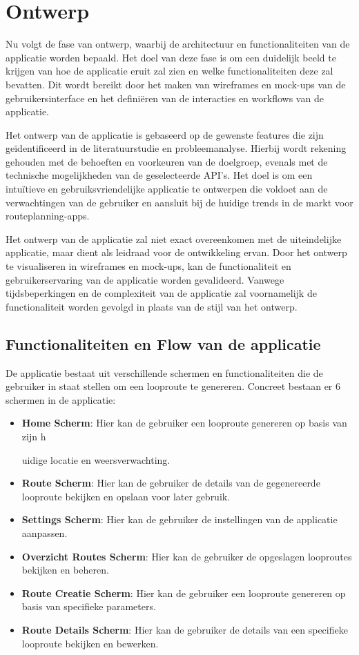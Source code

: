 \section{Ontwerp}

Nu volgt de fase van ontwerp, waarbij de architectuur en functionaliteiten van de applicatie worden bepaald. Het doel van deze fase is om een duidelijk beeld te krijgen van hoe de applicatie eruit zal zien en welke functionaliteiten deze zal bevatten. Dit wordt bereikt door het maken van wireframes en mock-ups van de gebruikersinterface en het definiëren van de interacties en workflows van de applicatie.

Het ontwerp van de applicatie is gebaseerd op de gewenste features die zijn geïdentificeerd in de literatuurstudie en probleemanalyse. Hierbij wordt rekening gehouden met de behoeften en voorkeuren van de doelgroep, evenals met de technische mogelijkheden van de geselecteerde API's. Het doel is om een intuïtieve en gebruiksvriendelijke applicatie te ontwerpen die voldoet aan de verwachtingen van de gebruiker en aansluit bij de huidige trends in de markt voor routeplanning-apps.

Het ontwerp van de applicatie zal niet exact overeenkomen met de uiteindelijke applicatie, maar dient als leidraad voor de ontwikkeling ervan. Door het ontwerp te visualiseren in wireframes en mock-ups, kan de functionaliteit en gebruikerservaring van de applicatie worden gevalideerd. Vanwege tijdsbeperkingen en de complexiteit van de applicatie zal voornamelijk de functionaliteit worden gevolgd in plaats van de stijl van het ontwerp.

\subsection{Functionaliteiten en Flow van de applicatie}

De applicatie bestaat uit verschillende schermen en functionaliteiten die de gebruiker in staat stellen om een looproute te genereren. Concreet bestaan er 6 schermen in de applicatie:

\begin{itemize}
    \item \textbf{Home Scherm}: Hier kan de gebruiker een looproute genereren op basis van zijn h

uidige locatie en weersverwachting.
    \item \textbf{Route Scherm}: Hier kan de gebruiker de details van de gegenereerde looproute bekijken en opslaan voor later gebruik.
    \item \textbf{Settings Scherm}: Hier kan de gebruiker de instellingen van de applicatie aanpassen.
    \item \textbf{Overzicht Routes Scherm}: Hier kan de gebruiker de opgeslagen looproutes bekijken en beheren.
    \item \textbf{Route Creatie Scherm}: Hier kan de gebruiker een looproute genereren op basis van specifieke parameters.
    \item \textbf{Route Details Scherm}: Hier kan de gebruiker de details van een specifieke looproute bekijken en bewerken.
\end{itemize}

